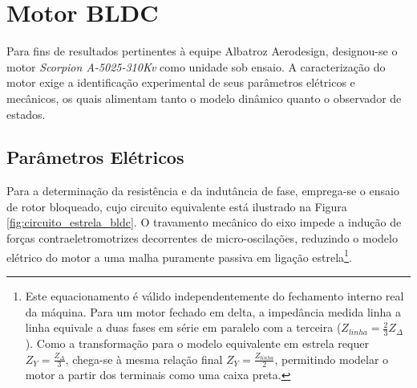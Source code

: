 \section{Motor BLDC}
\label{sec:motor_bldc}

Para fins de resultados pertinentes à equipe Albatroz Aerodesign, designou-se o motor \textit{Scorpion A-5025-310Kv} como unidade sob ensaio. A caracterização do motor exige a identificação experimental de seus parâmetros elétricos e mecânicos, os quais alimentam tanto o modelo dinâmico quanto o observador de estados.

\subsection{Parâmetros Elétricos}
\label{sec:params_eletricos}

Para a determinação da resistência e da indutância de fase, emprega-se o ensaio de rotor bloqueado, cujo circuito equivalente está ilustrado na Figura \ref{fig:circuito_estrela_bldc}. O travamento mecânico do eixo impede a indução de forças contraeletromotrizes decorrentes de micro-oscilações, reduzindo o modelo elétrico do motor a uma malha puramente passiva em ligação estrela\footnote{Este equacionamento é válido independentemente do fechamento interno real da máquina. Para um motor fechado em delta, a impedância medida linha a linha equivale a duas fases em série em paralelo com a terceira ($Z_{linha} = \frac{2}{3}Z_{\Delta}$). Como a transformação para o modelo equivalente em estrela requer $Z_Y = \frac{Z_{\Delta}}{3}$, chega-se à mesma relação final $Z_Y = \frac{Z_{linha}}{2}$, permitindo modelar o motor a partir dos terminais como uma caixa preta.}.

